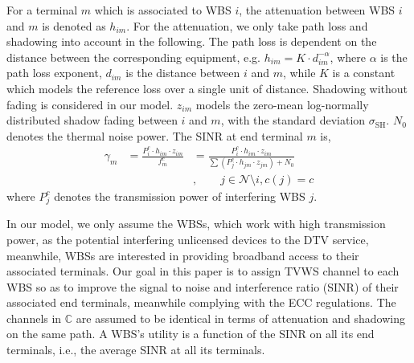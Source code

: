 \documentclass[times]{ettauth}
\newcommand{\ie}{i.e., }
\theoremstyle{mytheoremstyle}
\theoremstyle{mytheoremstyle}
\theoremstyle{mytheoremstyle}
\begin{document}
For a terminal $m$ which is associated to WBS $i$, the attenuation between WBS $i$ and $m$ is denoted as $h_{im}$.
For the attenuation, we only take path loss and shadowing into account in the following.
The path loss is dependent on the distance between the corresponding equipment, e.g. $h_{im}=K \cdot d_{im}^{-\alpha}$, where $\alpha$ is the path loss exponent, $d_{im}$ is the distance between $i$ and $m$, while $K$ is a constant which models the reference loss over a single unit of distance.
Shadowing without fading is considered in our model.
$z_{im}$ models the zero-mean log-normally distributed shadow fading between $i$ and $m$, with the standard deviation $\sigma_{\text{SH}}$.
$N_0$ denotes the thermal noise power.
%
The SINR at end terminal $m$ is,
\begin{equation}
\label{SINR}
\begin{aligned}
\gamma_{m}  & = \frac{P_{i}^c \cdot h_{im}\cdot z_{im}} {f_m^c} & = \frac{P_{i}^c \cdot h_{im}\cdot z_{im}} {\sum (P_{j}^c \cdot h_{jm} \cdot z_{jm}) +  N_0}\\
					& &, \quad \quad j\in \mathcal{N}\setminus i, c(j) = c
\end{aligned}
\end{equation}
where $P_{j}^c$ denotes the transmission power of interfering WBS $j$.



In our model, we only assume the WBSs, which work with high transmission power, as the potential interfering unlicensed devices to the DTV service, meanwhile, WBSs are interested in providing broadband access to their associated terminals.
Our goal in this paper is to assign TVWS channel to each WBS so as to improve the signal to noise and interference ratio (SINR) of their associated end terminals, meanwhile complying with the ECC regulations.
The channels in $\mathbb{C}$ are assumed to be identical in terms of attenuation and shadowing on the same path.
A WBS's utility is a function of the SINR on all its end terminals, \ie the average SINR at all its terminals.
\end{document}
